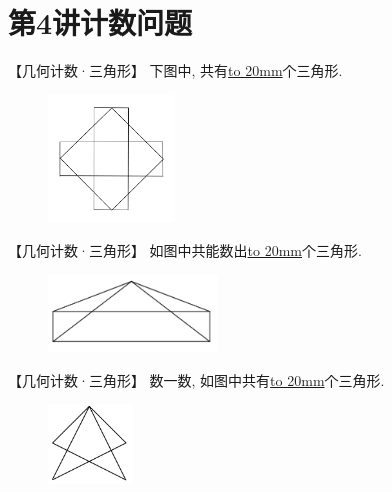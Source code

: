 \section{第4讲\quad 计数问题}

\item {
    【几何计数·三角形】
    下图中, 共有\underline{\hbox to 20mm{}}个三角形.
    \begin{figure}[H] 
        \centering
        \includegraphics[width=0.3\textwidth]{./pics/Chapter_4/12.png}
    \end{figure}
}

\item {
    【几何计数·三角形】
    如图中共能数出\underline{\hbox to 20mm{}}个三角形.
    \begin{figure}[H] 
        \centering
        \includegraphics[width=0.4\textwidth]{./pics/Chapter_4/2015_1.png}
    \end{figure}
}

\item {
    【几何计数·三角形】
    数一数, 如图中共有\underline{\hbox to 20mm{}}个三角形.
    \begin{figure}[H] 
        \centering
        \includegraphics[width=0.2\textwidth]{./pics/Chapter_4/2015_2.png}
    \end{figure}
}

